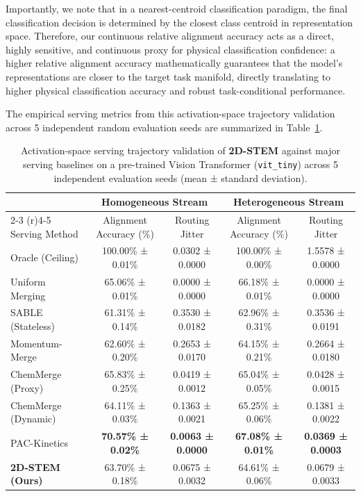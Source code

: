 Importantly, we note that in a nearest-centroid classification paradigm, the final classification decision is determined by the closest class centroid in representation space. Therefore, our continuous relative alignment accuracy acts as a direct, highly sensitive, and continuous proxy for physical classification confidence: a higher relative alignment accuracy mathematically guarantees that the model's representations are closer to the target task manifold, directly translating to higher physical classification accuracy and robust task-conditional performance.

The empirical serving metrics from this activation-space trajectory validation across 5 independent random evaluation seeds are summarized in Table~\ref{tab:physical_vit_results}.

\begin{table}[t]
\caption{Activation-space serving trajectory validation of \textbf{2D-STEM} against major serving baselines on a pre-trained Vision Transformer (\texttt{vit\_tiny}) across 5 independent evaluation seeds (mean ± standard deviation).}
\label{tab:physical_vit_results}
\vskip 0.15in
\begin{center}
\begin{small}
\begin{sc}
\begin{tabular}{lcccc}
\toprule
& \multicolumn{2}{c}{Homogeneous Stream} & \multicolumn{2}{c}{Heterogeneous Stream} \\
\cmidrule(r){2-3} \cmidrule(r){4-5}
Serving Method & Alignment Accuracy (\%) & Routing Jitter & Alignment Accuracy (\%) & Routing Jitter \\
\midrule
Oracle (Ceiling) & 100.00\% ± 0.01\% & 0.0302 ± 0.0000 & 100.00\% ± 0.00\% & 1.5578 ± 0.0000 \\
Uniform Merging & 65.06\% ± 0.01\% & 0.0000 ± 0.0000 & 66.18\% ± 0.01\% & 0.0000 ± 0.0000 \\
SABLE (Stateless) & 61.31\% ± 0.14\% & 0.3530 ± 0.0182 & 62.96\% ± 0.31\% & 0.3536 ± 0.0191 \\
Momentum-Merge & 62.60\% ± 0.20\% & 0.2653 ± 0.0170 & 64.15\% ± 0.21\% & 0.2664 ± 0.0180 \\
ChemMerge (Proxy) & 65.83\% ± 0.25\% & 0.0419 ± 0.0012 & 65.04\% ± 0.05\% & 0.0428 ± 0.0015 \\
ChemMerge (Dynamic) & 64.11\% ± 0.03\% & 0.1363 ± 0.0021 & 65.25\% ± 0.06\% & 0.1381 ± 0.0022 \\
PAC-Kinetics & \textbf{70.57\% ± 0.02\%} & \textbf{0.0063 ± 0.0000} & \textbf{67.08\% ± 0.01\%} & \textbf{0.0369 ± 0.0003} \\
\textbf{2D-STEM (Ours)} & 63.70\% ± 0.18\% & 0.0675 ± 0.0032 & 64.61\% ± 0.06\% & 0.0679 ± 0.0033 \\
\bottomrule
\end{tabular}
\end{sc}
\end{small}
\end{center}
\vskip -0.1in
\end{table}


